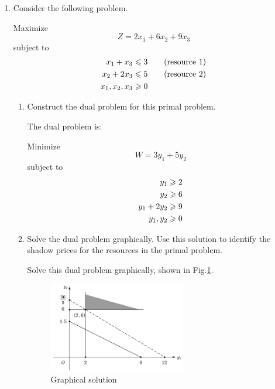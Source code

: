 \documentclass[a4paper]{article}
\begin{document}
\courseheader
{}

\begin{enumerate}
  \setlength{\itemsep}{3\parskip}

  \item Consider the following problem.
  
  Maximize $$Z=2x_1+6x_2+9x_3$$
  subject to
  \begin{equation*}
  \begin{aligned}
  x_1+x_3&\leqslant 3\qquad\text{(resource 1)}\\
  x_2+2x_3&\leqslant 5\qquad\text{(resource 2)}\\
  x_1,x_2,x_3&\geqslant 0\\
  \end{aligned}
  \end{equation*}

\begin{enumerate}
	\item Construct the dual problem for this primal problem.
	
	\begin{solution}
		The dual problem is:
		
		  Minimize $$W=3y_1+5y_2$$
		subject to
		\begin{equation*}
		\begin{aligned}
		y_1&\geqslant 2\\
		y_2&\geqslant 6\\
		y_1+2y_2&\geqslant 9\\
		y_1,y_2&\geqslant 0
		\end{aligned}
		\end{equation*}
	\end{solution}
	
	\item Solve the dual problem graphically. Use this solution to identify the shadow prices for the resources in the primal problem.
	
	\begin{solution}
		Solve this dual problem graphically, shown in Fig.\ref{f1}.
		  \begin{figure}[htbp]
			\centering
			\includegraphics[width = 0.6\textwidth]{f1}
			\caption{Graphical solution}
			\label{f1}
		\end{figure}
	

\end{solution}
\end{enumerate}
\end{enumerate}
\end{document}
